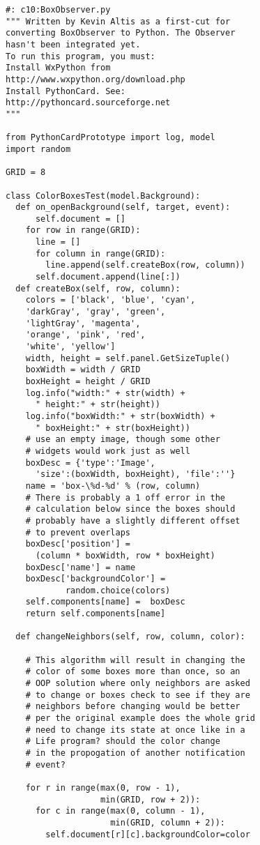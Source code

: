 \begin{lstlisting} 
#: c10:BoxObserver.py 
""" Written by Kevin Altis as a first-cut for 
converting BoxObserver to Python. The Observer 
hasn't been integrated yet. 
To run this program, you must: 
Install WxPython from 
http://www.wxpython.org/download.php 
Install PythonCard. See: 
http://pythoncard.sourceforge.net 
""" 

from PythonCardPrototype import log, model 
import random 

GRID = 8 

class ColorBoxesTest(model.Background): 
  def on_openBackground(self, target, event):
      self.document = [] 
    for row in range(GRID): 
      line = [] 
      for column in range(GRID): 
        line.append(self.createBox(row, column)) 
      self.document.append(line[:]) 
  def createBox(self, row, column): 
    colors = ['black', 'blue', 'cyan', 
    'darkGray', 'gray', 'green', 
    'lightGray', 'magenta', 
    'orange', 'pink', 'red', 
    'white', 'yellow'] 
    width, height = self.panel.GetSizeTuple() 
    boxWidth = width / GRID 
    boxHeight = height / GRID 
    log.info("width:" + str(width) + 
      " height:" + str(height)) 
    log.info("boxWidth:" + str(boxWidth) + 
      " boxHeight:" + str(boxHeight)) 
    # use an empty image, though some other 
    # widgets would work just as well 
    boxDesc = {'type':'Image', 
      'size':(boxWidth, boxHeight), 'file':''} 
    name = 'box-\%d-%d' % (row, column) 
    # There is probably a 1 off error in the 
    # calculation below since the boxes should 
    # probably have a slightly different offset 
    # to prevent overlaps 
    boxDesc['position'] = 
      (column * boxWidth, row * boxHeight) 
    boxDesc['name'] = name 
    boxDesc['backgroundColor'] = 
            random.choice(colors) 
    self.components[name] =  boxDesc 
    return self.components[name] 
    
  def changeNeighbors(self, row, column, color): 
  
    # This algorithm will result in changing the 
    # color of some boxes more than once, so an 
    # OOP solution where only neighbors are asked 
    # to change or boxes check to see if they are 
    # neighbors before changing would be better 
    # per the original example does the whole grid 
    # need to change its state at once like in a 
    # Life program? should the color change  
    # in the propogation of another notification 
    # event? 
    
    for r in range(max(0, row - 1),  
                   min(GRID, row + 2)): 
      for c in range(max(0, column - 1),  
                     min(GRID, column + 2)): 
        self.document[r][c].backgroundColor=color 
        

\end{lstlisting}

